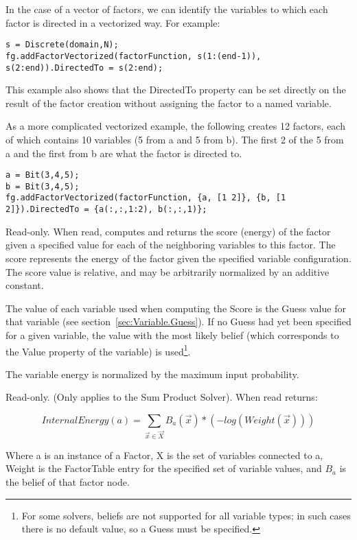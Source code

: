 In the case of a vector of factors, we can identify the variables to which each factor is directed in a vectorized way.  For example:

\begin{lstlisting}
s = Discrete(domain,N);
fg.addFactorVectorized(factorFunction, s(1:(end-1)), s(2:end)).DirectedTo = s(2:end);
\end{lstlisting}

This example also shows that the DirectedTo property can be set directly on the result of the factor creation without assigning the factor to a named variable.

As a more complicated vectorized example, the following creates 12 factors, each of which contains 10 variables (5 from a and 5 from b).  The first 2 of the 5 from a and the first from b are what the factor is directed to.

\begin{lstlisting}
a = Bit(3,4,5);
b = Bit(3,4,5);
fg.addFactorVectorized(factorFunction, {a, [1 2]}, {b, [1 2]}).DirectedTo = {a(:,:,1:2), b(:,:,1)};
\end{lstlisting}
\fi

\label{sec:Factor.Score}

Read-only.  When read, computes and returns the score (energy) of the factor given a specified value for each of the neighboring variables to this factor.  The score represents the energy of the factor given the specified variable configuration.  The score value is relative, and may be arbitrarily normalized by an additive constant.

The value of each variable used when computing the Score is the Guess value for that variable (see section~\ref{sec:Variable.Guess}).  If no Guess had yet been specified for a given variable, the value with the most likely belief (which corresponds to the Value property of the variable) is used\footnote{For some solvers, beliefs are not supported for all variable types; in such cases there is no default value, so a Guess must be specified.}.

The variable energy is normalized by the maximum input probability.

\label{sec:Factor.InternalEnergy}

Read-only.  (Only applies to the Sum Product Solver).  When read returns:

\[
InternalEnergy(a) = \sum_{\vec{x} \in \vec{X}}B_a(\vec{x})*(-log(Weight(\vec{x})))
\]

Where a is an instance of a Factor, X is the set of variables connected to a, Weight is the FactorTable entry for the specified set of variable values, and $B_a$ is the belief of that factor node.

